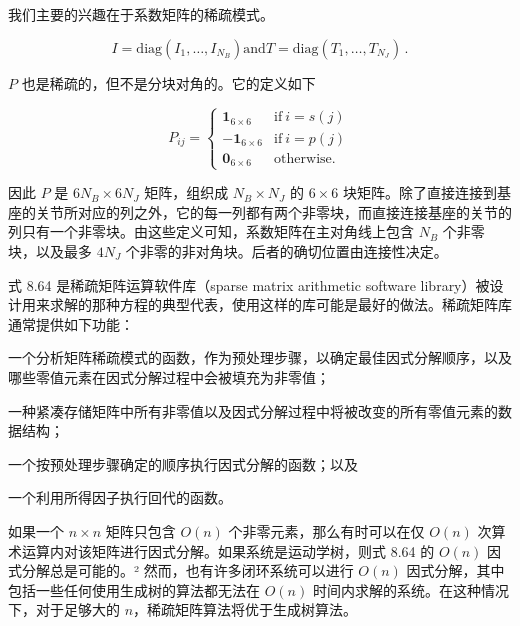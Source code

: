 \documentclass[10pt,a4paper]{book}
\theoremstyle{thmstyle} %
\theoremstyle{defstyle} %
\theoremstyle{prostyle} %
\begin{document}
我们主要的兴趣在于系数矩阵的稀疏模式。



$$
I = \mathrm { d i a g } ( I _ { 1 } , \ldots , I _ { N _ { B } } )  \mathrm { a n d }  T = \mathrm { d i a g } ( T _ { 1 } , \ldots , T _ { N _ { J } } ) \, .
$$



$P$ 也是稀疏的，但不是分块对角的。它的定义如下



$$
P _ { i j } = \left\{ \begin{array}{ll} { { \mathbf { 1 } _ { 6 \times 6 } } } & { { \mathrm { i f ~ } i = s ( j ) } } \\{ { - \mathbf { 1 } _ { 6 \times 6 } } } & { { \mathrm { i f ~ } i = p ( j ) } } \\{ { \mathbf { 0 } _ { 6 \times 6 } } } & { { \mathrm { o t h e r w i s e } . } } \end{array} \right.
$$



因此 $P$ 是 $6N_{B} \times 6N_{J}$ 矩阵，组织成 $N_{B} \times N_{J}$ 的 $6 \times 6$ 块矩阵。除了直接连接到基座的关节所对应的列之外，它的每一列都有两个非零块，而直接连接基座的关节的列只有一个非零块。由这些定义可知，系数矩阵在主对角线上包含 $N_{B}$ 个非零块，以及最多 $4N_{J}$ 个非零的非对角块。后者的确切位置由连接性决定。



式 8.64 是稀疏矩阵运算软件库（sparse matrix arithmetic software library）被设计用来求解的那种方程的典型代表，使用这样的库可能是最好的做法。稀疏矩阵库通常提供如下功能：



一个分析矩阵稀疏模式的函数，作为预处理步骤，以确定最佳因式分解顺序，以及哪些零值元素在因式分解过程中会被填充为非零值；



一种紧凑存储矩阵中所有非零值以及因式分解过程中将被改变的所有零值元素的数据结构；



一个按预处理步骤确定的顺序执行因式分解的函数；以及



一个利用所得因子执行回代的函数。



如果一个 $n \times n$ 矩阵只包含 $O(n)$ 个非零元素，那么有时可以在仅 $O(n)$ 次算术运算内对该矩阵进行因式分解。如果系统是运动学树，则式 8.64 的 $O(n)$ 因式分解总是可能的。² 然而，也有许多闭环系统可以进行 $O(n)$ 因式分解，其中包括一些任何使用生成树的算法都无法在 $O(n)$ 时间内求解的系统。在这种情况下，对于足够大的 $n$，稀疏矩阵算法将优于生成树算法。
\end{document}
